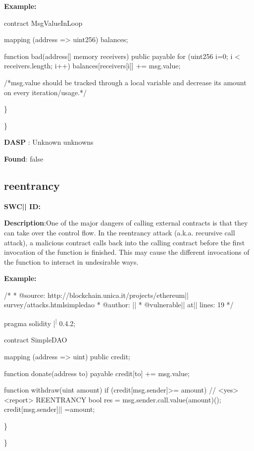\documentclass{article}
\begin{document}
\textbf{Example:} 
\begin{ffcode} 

contract MsgValueInLoop{
    mapping (address => uint256) balances;

    function bad(address[] memory receivers) public payable {
        for (uint256 i=0; i < receivers.length; i++) {
            balances[receivers[i]] += msg.value;
        }
    }
}

 /*msg.value should be tracked through a local variable and decrease its amount on every iteration/usage.*/ 

\end{ffcode} 
\} 

\} 

\textbf{DASP} : Unknown unknowns

\textbf{Found}: false

\subsection{reentrancy} 
\textbf{SWC{|\textunderscore| }ID:} 

\textbf{Description}:One of the major dangers of calling external contracts is that they can take over the control flow. In the reentrancy attack (a.k.a. recursive call attack), a malicious contract calls back into the calling contract before the first invocation of the function is finished. This may cause the different invocations of the function to interact in undesirable ways.


\textbf{Example:} 
\begin{ffcode} 

/*
* @source: http://blockchain.unica.it/projects/ethereum|\textendash| survey/attacks.htmlsimpledao
* @author: |\textendash| 
* @vulnerable|\textunderscore| at|\textunderscore| lines: 19
*/

pragma solidity |\textsuperscript| 0.4.2;

contract SimpleDAO {
  mapping (address => uint) public credit;

  function donate(address to) payable {
    credit[to] += msg.value;
  }

  function withdraw(uint amount) {
    if (credit[msg.sender]>= amount) {
      // <yes> <report> REENTRANCY
      bool res = msg.sender.call.value(amount)();
      credit[msg.sender]|\textendash| =amount;
    }
  }
}

\end{ffcode} 
\} 

\} 
\end{document}
